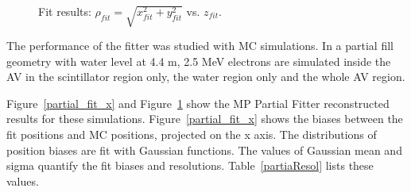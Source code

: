 \documentclass[preprint,12pt]{elsarticle}
\numberwithin{equation}{section}
\begin{document}
\begin{figure}[htbp]
{\begin{minipage}[t]{0.38\textwidth}
		\end{minipage}
	}
	\caption{Fit results: $\rho_{fit}=\sqrt{x_{fit}^2+y_{fit}^2}$ vs. $z_{fit}$.}
	\label{partial_fit_rz}
\end{figure}

The performance of the fitter was studied with MC simulations. In a partial fill geometry with water level at 4.4 m, 2.5 MeV electrons are simulated inside the AV in the scintillator region only, the water region only and the whole AV region.

Figure~\ref{partial_fit_x} and Figure~\ref{partial_fit_rz} show the MP Partial Fitter reconstructed results for these simulations. Figure~\ref{partial_fit_x} shows the biases between the fit positions and MC positions, projected on the x axis. The distributions of position biases are fit with Gaussian functions. The values of Gaussian mean and sigma quantify the fit biases and resolutions. Table~\ref{partiaResol} lists these values.
\end{document}
